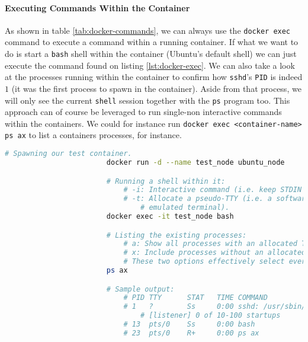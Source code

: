                \paragraph{Executing Commands Within the Container}
                    As shown in table \ref{tab:docker-commands}, we can always use the \texttt{docker exec} command to execute a command within a running container. If what we want to do is start a \texttt{bash} shell within the container (Ubuntu's default shell) we can just execute the command found on listing \ref{lst:docker-exec}. We can also take a look at the processes running within the container to confirm how \texttt{sshd}'s \texttt{PID} is indeed $1$ (it was the first process to spawn in the container). Aside from that process, we will only see the current \texttt{shell} session together with the \texttt{ps} program too. This approach can of course be leveraged to run single-non interactive commands within the containers. We could for instance run \texttt{docker exec <container-name> ps ax} to list a containers processes, for instance.\\

                    \begin{lstlisting}[language = bash, caption = Inspecting a container's processes., label = lst:docker-exec]
                        # Spawning our test container.
                        docker run -d --name test_node ubuntu_node

                        # Running a shell within it:
                            # -i: Interactive command (i.e. keep STDIN open).
                            # -t: Allocate a pseudo-TTY (i.e. a software
                                # emulated terminal).
                        docker exec -it test_node bash

                        # Listing the existing processes:
                            # a: Show all processes with an allocated TTY.
                            # x: Include processes without an allocated TTY.
                            # These two options effectively select every process.
                        ps ax

                        # Sample output:
                            # PID TTY      STAT   TIME COMMAND
                            # 1   ?        Ss     0:00 sshd: /usr/sbin/sshd -D \
                                # [listener] 0 of 10-100 startups
                            # 13  pts/0    Ss     0:00 bash
                            # 23  pts/0    R+     0:00 ps ax
                    \end{lstlisting}

